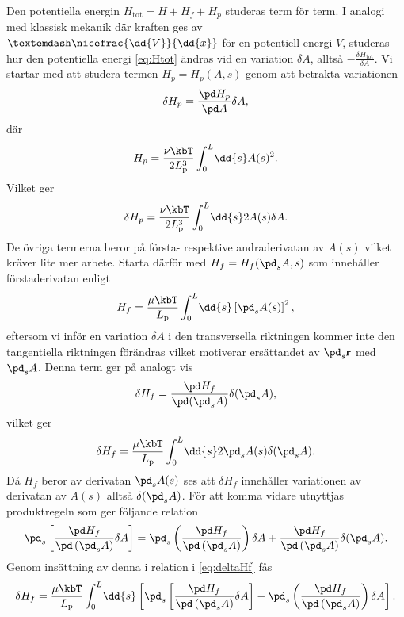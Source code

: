 Den potentiella energin $H_\text{tot} = H + H_f + H_p$ studeras term för term. I analogi med klassisk mekanik där kraften ges av $—\nicefrac{\dd{V}}{\dd{x}}$ för en potentiell energi $V$, studeras hur den potentiella energi \eqref{eq:Htot} ändras vid en variation $\delta A$, alltså $-\frac{\delta H_\text{tot}}{\delta A}$. Vi startar med att studera termen $H_p = H_p(A,s)$ genom att betrakta variationen 
\begin{equation}
    \delta H_p = \frac{\pd H_p}{\pd A}\delta A,
\end{equation}
där 
\begin{equation}
    H_p = \frac{\nu\kbT}{2L_\text{p}^3}\int_0^L\!\dd{s} A(s)^2.
\end{equation}
Vilket ger 
\begin{equation}
    \delta H_p = \frac{\nu\kbT}{2L_\text{p}^3}\int_0^L\!\dd{s} 2A(s)\delta A.
\end{equation}
De övriga termerna beror på första- respektive andraderivatan av $A(s)$ vilket kräver lite mer arbete. Starta därför med $H_f=H_f(\pd_sA,s)$ som innehåller förstaderivatan enligt
\begin{equation}
    H_f = \frac{\mu\kbT}{L_\text{p}}\int_0^L\!\dd{s}\left[\pd_s A(s)\right]^2,
\end{equation}
eftersom vi inför en variation $\delta A$ i den transversella riktningen kommer inte den tangentiella riktningen förändras vilket motiverar ersättandet av $\pd_s\mathbf{r}$ med $\pd_sA$. Denna term ger på analogt vis 
\begin{equation}
    \delta H_f = \frac{\pd H_f}{\pd (\pd_s A)}\delta(\pd_sA),
\end{equation}
vilket ger 
\begin{equation}
    \label{eq:deltaHf}
    \delta H_f =  \frac{\mu\kbT}{L_\text{p}}\int_0^L\!\dd{s} 2\pd_sA(s)\delta (\pd_s A).
\end{equation}
Då $H_f$ beror av derivatan $\pd_sA(s)$ ses att $\delta H_f$ innehåller variationen av derivatan av $A(s)$ alltså $\delta (\pd_sA)$. För att komma vidare utnyttjas produktregeln som ger följande relation 
\begin{equation}
    \pd_s\left[\frac{\pd H_f}{\pd \left(\pd_sA\right)}\delta A\right] = \pd_s\left(\frac{\pd H_f}{\pd \left(\pd_sA\right)}\right)\delta A+\frac{\pd H_f}{\pd \left(\pd_sA\right)}\delta(\pd_sA).
\end{equation}
Genom insättning av denna i relation i \eqref{eq:deltaHf} fås 
\begin{equation}
    \delta H_f = \frac{\mu\kbT}{L_\text{p}}\int_0^L\!\dd{s} \left[\pd_s\left[\frac{\pd H_f}{\pd \left(\pd_sA\right)}\delta A\right]-\pd_s\left(\frac{\pd H_f}{\pd \left(\pd_sA\right)}\right)\delta A \right].
\end{equation}

